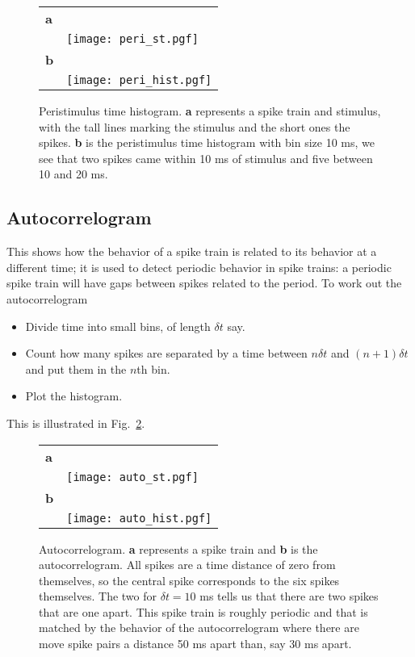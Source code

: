 \documentclass[11pt,a4paper]{scrartcl}
\begin{document}
\begin{figure}
\begin{center}
\begin{tabular}{ll}
\textbf{a}&\\
&\texttt{[image: peri\_st.pgf]}\\[1cm]
\textbf{b}&\\
&\texttt{[image: peri\_hist.pgf]}
\end{tabular}
\end{center}
\caption{Peristimulus time histogram. \textbf{a} represents a spike
  train and stimulus, with the tall lines marking the stimulus and the
  short ones the spikes. \textbf{b} is the peristimulus time histogram
  with bin size 10 ms, we see that two spikes came within 10 ms of
  stimulus and five between 10 and 20 ms.\label{peri}}
\end{figure}

\subsection*{Autocorrelogram}
This shows how the behavior of a spike train is related to its
behavior at a different time; it is used to detect periodic behavior
in spike trains: a periodic spike train will have gaps between spikes
related to the period. To work out the autocorrelogram
\begin{itemize}
\item Divide time into small bins, of length $\delta t$ say. 
\item Count how many spikes are separated by a time between $n\delta
  t$ and $(n+1)\delta t$ and put them in the $n$th bin.
\item Plot the histogram.
\end{itemize}
This is illustrated in Fig.~\ref{auto}.

\begin{figure}
\begin{center}
\begin{tabular}{ll}
\textbf{a}&\\
&\texttt{[image: auto\_st.pgf]}\\[1cm]
\textbf{b}&\\
&\texttt{[image: auto\_hist.pgf]}
\end{tabular}
\end{center}
\caption{Autocorrelogram. \textbf{a} represents a spike train and
  \textbf{b} is the autocorrelogram. All spikes are a time distance of
  zero from themselves, so the central spike corresponds to the six
  spikes themselves.  The two for $\delta t=10$ ms tells us that there are
  two spikes that are one apart. This spike train is roughly periodic
  and that is matched by the behavior of the autocorrelogram where
  there are move spike pairs a distance 50 ms apart than, say 30 ms
  apart.\label{auto}}
\end{figure}
\end{document}
